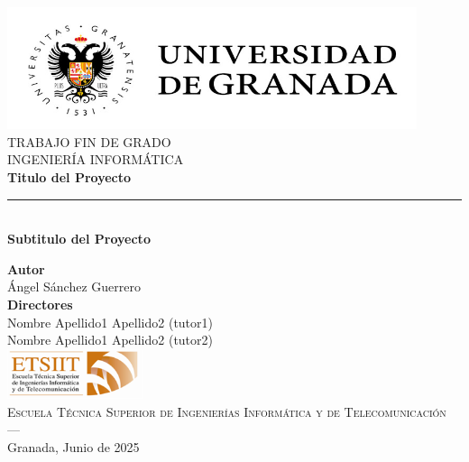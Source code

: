 \begin{titlepage}
 
 
    \newlength{\centeroffset}
    \setlength{\centeroffset}{-0.5\oddsidemargin}
    \addtolength{\centeroffset}{0.5\evensidemargin}
    \thispagestyle{empty}
    
    \noindent\hspace*{\centeroffset}\begin{minipage}{\textwidth}
    
    \centering
    \includegraphics[width=0.9\textwidth]{imagenes/logo_ugr.jpg}\\[1.4cm]
    
    \textsc{ \Large TRABAJO FIN DE GRADO\\[0.2cm]}
    \textsc{ INGENIERÍA INFORMÁTICA}\\[1cm]
    {\Huge\bfseries Titulo del Proyecto\\
    }
    \noindent\rule[-1ex]{\textwidth}{3pt}\\[3.5ex]
    {\large\bfseries Subtitulo del Proyecto}
    \end{minipage}
    
    \vspace{2.5cm}
    \noindent\hspace*{\centeroffset}\begin{minipage}{\textwidth}
    \centering
    
    \textbf{Autor}\\ {Ángel Sánchez Guerrero}\\[2.5ex]
    \textbf{Directores}\\
    {Nombre Apellido1 Apellido2 (tutor1)\\
    Nombre Apellido1 Apellido2 (tutor2)}\\[2cm]
    \includegraphics[width=0.3\textwidth]{imagenes/etsiit_logo.png}\\[0.1cm]
    \textsc{Escuela Técnica Superior de Ingenierías Informática y de Telecomunicación}\\
    \textsc{---}\\
    Granada, Junio de 2025
    \end{minipage}
    \end{titlepage}
    
    
    